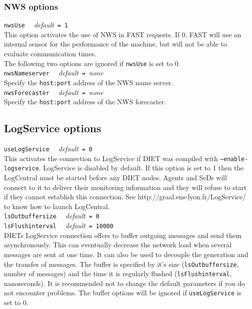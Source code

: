 \subsubsection{NWS options}

\noindent
\texttt{nwsUse} \ \ \emph{default}\texttt{ = 1}\\
This option activates the use of NWS in FAST requests. If 0, FAST will use an
internal sensor for the performance of the machine, but will not be able to
evaluate communication times.
\\

The following two options are ignored if \texttt{nwsUse} is set to 0.
\\

\noindent
\texttt{nwsNameserver} \ \ \emph{default}\texttt{ = }\emph{none}\\
Specify the \texttt{host:port} address of the NWS name server.
\\

\noindent
\texttt{nwsForecaster} \ \ \emph{default}\texttt{ = }\emph{none}\\
Specify the \texttt{host:port} address of the NWS forecaster.
\\


\subsection{LogService options}

\noindent
\texttt{useLogService} \ \ \emph{default}\texttt{ = 0}\\
This activates the connection to LogService if DIET was compiled with
\texttt{--enable-logservice}. LogService is disabled by default.
If this option is set to 1 then the LogCentral must be started
before any DIET nodes. Agents and SeDs will connect to it to
deliver their monitoring information and they will refuse to
start if they cannot establish this connection. See http://graal.ens-lyon.fr/LogService/
to know how to launch LogCentral.
\\

\noindent
\texttt{lsOutbuffersize} \ \ \emph{default}\texttt{ = 0}\\
\noindent
\texttt{lsFlushinterval} \ \ \emph{default}\texttt{ = 10000}\\
DIETs LogService connection offers to buffer outgoing messages
and send them asynchronously. This can eventually decrease the network
load when several messages are sent at one time. It can also be used
to decouple the generation and the transfer of messages.
The buffer is specified by it's size (\texttt{lsOutbuffersize},
number of messages) and the time it is regularly flushed
(\texttt{lsFlushinterval}, nanoseconds). It is recommended not
to change the default parameters if you do not encounter
problems. The buffer options will be ignored if \texttt{useLogService}
is set to 0.

